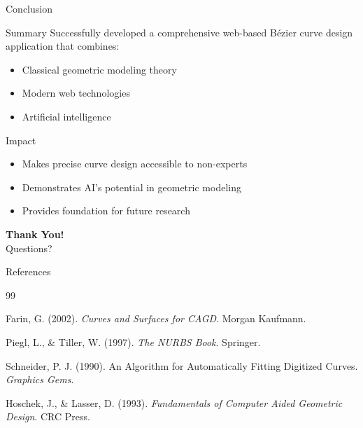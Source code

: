 \documentclass{beamer}
\begin{document}
\begin{frame}{Conclusion}
\begin{block}{Summary}
Successfully developed a comprehensive web-based Bézier curve design application that combines:
\begin{itemize}
    \item Classical geometric modeling theory
    \item Modern web technologies
    \item Artificial intelligence
\end{itemize}
\end{block}

\vspace{1em}

\begin{block}{Impact}
\begin{itemize}
    \item Makes precise curve design accessible to non-experts
    \item Demonstrates AI's potential in geometric modeling
    \item Provides foundation for future research
\end{itemize}
\end{block}

\vspace{1em}

\begin{center}
\Large \textbf{Thank You!}\\
\vspace{0.5em}
\normalsize Questions?
\end{center}
\end{frame}

\begin{frame}{References}
\footnotesize
\begin{thebibliography}{99}

Farin, G. (2002). \textit{Curves and Surfaces for CAGD}. Morgan Kaufmann.

Piegl, L., \& Tiller, W. (1997). \textit{The NURBS Book}. Springer.

Schneider, P. J. (1990). An Algorithm for Automatically Fitting Digitized Curves. \textit{Graphics Gems}.

Hoschek, J., \& Lasser, D. (1993). \textit{Fundamentals of Computer Aided Geometric Design}. CRC Press.

\end{thebibliography}
\end{frame}
\end{document}
